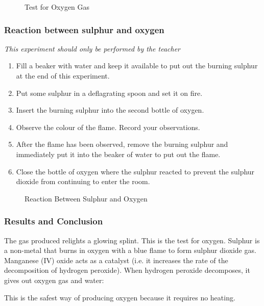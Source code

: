 \begin{figure}[h]
\begin{center}
\def\svgwidth{50pt}

\caption{Test for Oxygen Gas}
\label{fig:glowing-splint_oxygen-test}
\end{center}
\end{figure}

\subsubsection*{Reaction between sulphur and oxygen}
\textit{This experiment should only be performed by the teacher}
\begin{enumerate}
\item{Fill a beaker with water and keep it available to put out the burning sulphur at the end of this experiment.}
\item{Put some sulphur in a deflagrating spoon and set it on fire.}
\item{Insert the burning sulphur into the second bottle of oxygen.}
\item{Observe the colour of the flame. Record your observations.}
\item{After the flame has been observed, remove the burning sulphur and immediately put it into the beaker of water to put out the flame.}
\item{Close the bottle of oxygen where the sulphur reacted to prevent the sulphur dioxide from continuing to enter the room.}
\end{enumerate}
\begin{figure}[h]
\begin{center}
\caption{Reaction Between Sulphur and Oxygen}
\label{fig:sulphur_and_oxygen}
\end{center}
\end{figure}

\subsubsection*{Results and Conclusion}
The gas produced relights a glowing splint. This is the test for oxygen. Sulphur is a non-metal that burns in oxygen with a blue flame to form sulphur dioxide gas. Manganese (IV) oxide acts as a catalyst (i.e. it increases the rate of the decomposition of hydrogen peroxide). When hydrogen peroxide decomposes, it gives out oxygen gas and water:
\begin{center}
\end{center}
This is the safest way of producing oxygen because it requires no heating.

